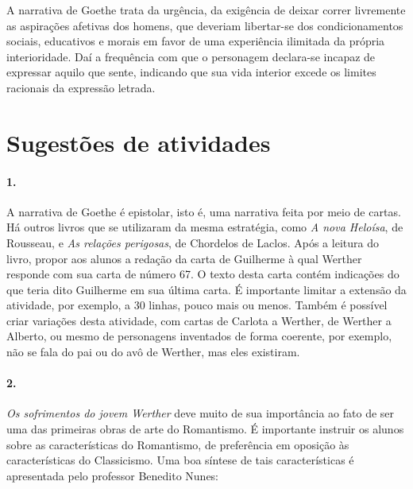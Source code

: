 \documentclass[11pt]{hedrabook}
\begin{document}
A narrativa de Goethe trata da urgência, da exigência de deixar correr
livremente as aspirações afetivas dos homens, que deveriam libertar-se dos
condicionamentos sociais, educativos e morais em favor de uma experiência
ilimitada da própria interioridade. Daí a frequência com que o personagem
declara-se incapaz de expressar aquilo que sente, indicando que sua vida
interior excede os limites racionais da expressão letrada. 


\section{Sugestões de atividades} 

\paragraph{1.}

A narrativa de Goethe é epistolar, isto é, uma narrativa feita por
meio de cartas. Há outros livros que se utilizaram da mesma estratégia,
como \textit{A nova Heloísa}, de Rousseau, e \textit{As relações
perigosas}, de Chordelos de Laclos. Após a leitura do livro, propor aos
alunos a redação da carta de Guilherme à qual Werther responde com sua
carta de número 67. O texto desta carta contém indicações do que teria
dito Guilherme em sua última carta. É importante limitar a extensão da
atividade, por exemplo, a 30 linhas, pouco mais ou menos. Também é
possível criar variações desta atividade, com cartas de Carlota a
Werther, de Werther a Alberto, ou mesmo de personagens inventados de
forma coerente, por exemplo, não se fala do pai ou do avô de Werther,
mas eles existiram.

\paragraph{2.}

\textit{Os sofrimentos do jovem Werther} deve muito de sua
importância ao fato de ser uma das primeiras obras de arte do
Romantismo. É importante instruir os alunos sobre as características do
Romantismo, de preferência em oposição às características do
Classicismo. Uma boa síntese de tais características é apresentada pelo
professor Benedito Nunes:
\end{document}
